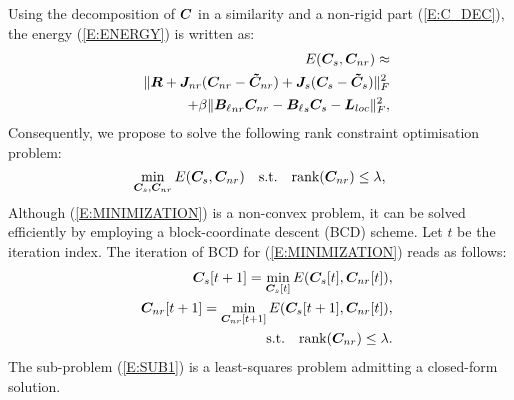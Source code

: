 Using the decomposition of $\boldsymbol{C}$ in a similarity and a non-rigid part (\ref{E:C_DEC}), the energy (\ref{E:ENERGY})
is written as:
\begin{eqnarray*}%
    &&E(\matr{C}_s,  \matr{C}_{nr} ) \approx \\
    &    &\norm{ \matr{R} + \matr{J}_{nr} (\matr{C}_{nr} - \matr{\tilde{C}}_{nr}) + \matr{J}_{s} (\matr{C}_{s} - \matr{\tilde{C}}_{s}) }_F^2 \nonumber \\
    &     &+ \beta \norm{{\matr{B}_\ell}_{nr} \matr{C}_{nr} - {\matr{B}_\ell}_{s} \matr{C}_{s} - \matr{L}_{loc}}_F^2,
\end{eqnarray*}
Consequently, we propose to solve the following rank constraint optimisation problem:
\begin{equation}\label{E:MINIMIZATION}
    \min_{\boldsymbol{C}_s,  \boldsymbol{C}_{nr}} E(\boldsymbol{C}_s,  \boldsymbol{C}_{nr} ) \quad \mbox{s.t.} \quad \mbox{rank}(\boldsymbol{C}_{nr}) \leq \lambda,
\end{equation}
Although (\ref{E:MINIMIZATION}) is a non-convex problem, it can be solved efficiently
by employing a block-coordinate descent (BCD) scheme. Let $t$ be the iteration index. The 
iteration of BCD for (\ref{E:MINIMIZATION}) reads as follows:
\begin{eqnarray}
    & &\boldsymbol{C}_s[t+1] =  \min_{\boldsymbol{C}_s[t]} E(\boldsymbol{C}_s[t],  \boldsymbol{C}_{nr}[t] ), \label{E:SUB1} \\ 
    & & \boldsymbol{C}_{nr}[t+1] =  \min_{\boldsymbol{C}_{nr}[t+1]} E(\boldsymbol{C}_s[t+1],  \boldsymbol{C}_{nr}[t] ), \nonumber \\
    & &\quad \mbox{s.t.} \quad \mbox{rank}(\boldsymbol{C}_{nr}) \leq \lambda. \label{E:SUB2}
\end{eqnarray}
The sub-problem (\ref{E:SUB1}) is a least-squares problem admitting a closed-form solution. 

